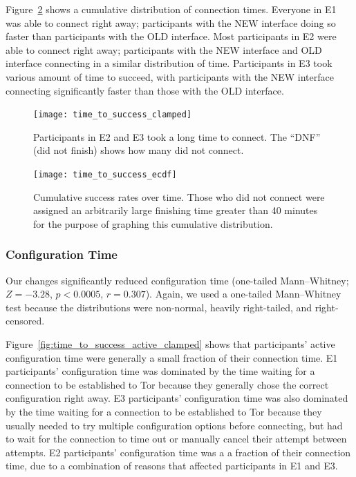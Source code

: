 \documentclass[USenglish,oneside,twocolumn]{article}
\begin{document}
Figure~\ref{fig:time_to_success_ecdf} shows a cumulative distribution of connection times. Everyone in E1 was able to connect right away; participants with the NEW interface doing so faster than participants with the OLD interface. Most participants in E2 were able to connect right away; participants with the NEW interface and OLD interface connecting in a similar distribution of time. Participants in E3 took various amount of time to succeed, with participants with the NEW interface connecting significantly faster than those with the OLD interface. 

\begin{figure}[t]
\centering
\texttt{[image: time\_to\_success\_clamped]}
\caption{
Participants in E2 and E3 took a long time to connect.
The ``DNF'' (did not finish) shows how many did not connect.}
\label{fig:time_to_success_clamped}
\end{figure}

\begin{figure}[t]
\centering
\texttt{[image: time\_to\_success\_ecdf]}
%
\caption{
Cumulative success rates over time. Those who did not connect were assigned an arbitrarily large finishing time greater than 40 minutes for the purpose of graphing this cumulative distribution. 
}
\label{fig:time_to_success_ecdf}
\end{figure}


\subsubsection{Configuration Time} 
Our changes significantly reduced configuration time (one-tailed Mann--Whitney; $Z = -3.28$, $p < 0.0005$, $r = 0.307$). Again, we used a one-tailed Mann--Whitney test because the distributions were non-normal, heavily right-tailed, and right-censored. 

Figure~\ref{fig:time_to_success_active_clamped} shows that participants' active configuration time were generally a small fraction of their connection time. E1 participants' configuration time was dominated by the time waiting for a connection to be established to Tor because they generally chose the correct configuration right away. E3 participants' configuration time was also dominated by the time waiting for a connection to be established to Tor because they usually needed to try multiple configuration options before connecting, but had to wait for the connection to time out or manually cancel their attempt between attempts. E2 participants' configuration time was a a fraction of their connection time, due to a combination of reasons that affected participants in E1 and E3. 
\end{document}
